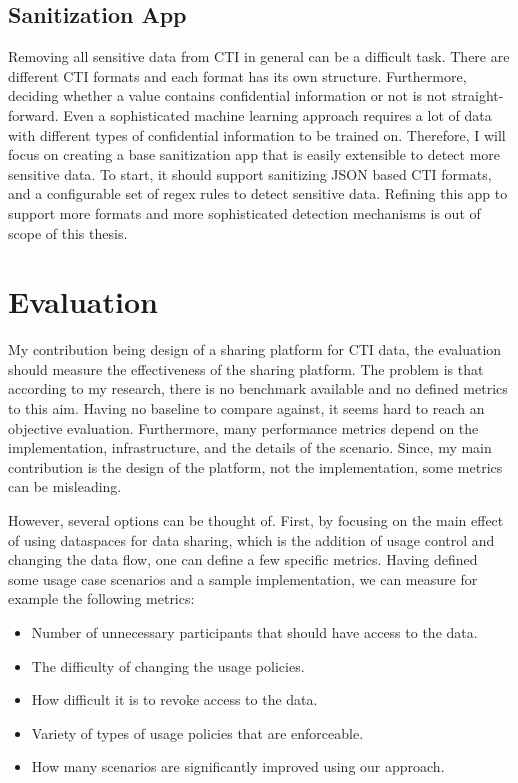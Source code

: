 \documentclass{article}
\begin{document}
\subsection*{Sanitization App}
Removing all sensitive data from CTI in general can be a difficult task. There are different CTI formats and each format has its own structure. Furthermore, deciding whether a value contains confidential information or not is not straight-forward. Even a sophisticated machine learning approach requires a lot of data with different types of confidential information to be trained on. Therefore, I will focus on creating a base sanitization app that is easily extensible to detect more sensitive data. To start, it should support sanitizing JSON based CTI formats, and a configurable set of regex rules to detect sensitive data. Refining this app to support more formats and more sophisticated detection mechanisms is out of scope of this thesis.

\section{Evaluation} %
\label{sec:evaluation}


My contribution being design of a sharing platform for CTI data, the evaluation should measure the effectiveness of the sharing platform. The problem is that according to my research, there is no benchmark available and no defined metrics to this aim. Having no baseline to compare against, it seems hard to reach an objective evaluation. Furthermore, many performance metrics depend on the implementation, infrastructure, and the details of the scenario. Since, my main contribution is the design of the platform, not the implementation, some metrics can be misleading. 

However, several options can be thought of. First, by focusing on the main effect of using dataspaces for data sharing, which is the addition of usage control and changing the data flow, one can define a few specific metrics. Having defined some usage case scenarios and a sample implementation, we can measure for example the following metrics: 
\begin{itemize}
    \item Number of unnecessary participants that should have access to the data.
    \item The difficulty of changing the usage policies.
    \item How difficult it is to revoke access to the data.
    \item Variety of types of usage policies that are enforceable.
    \item How many scenarios are significantly improved using our approach.
\end{itemize}
\end{document}
